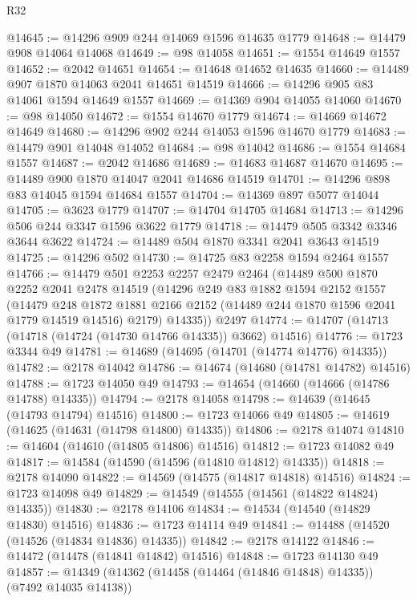 \begin{lexlean}{R32}
\begin{coremodule}
@14645 := @14296 @909 @244 @14069 @1596 @14635 @1779
@14648 := @14479 @908 @14064 @14068
@14649 := @98 @14058
@14651 := @1554 @14649 @1557
@14652 := @2042 @14651
@14654 := @14648 @14652 @14635
@14660 := @14489 @907 @1870 @14063 @2041 @14651 @14519
@14666 := @14296 @905 @83 @14061 @1594 @14649 @1557
@14669 := @14369 @904 @14055 @14060
@14670 := @98 @14050
@14672 := @1554 @14670 @1779
@14674 := @14669 @14672 @14649
@14680 := @14296 @902 @244 @14053 @1596 @14670 @1779
@14683 := @14479 @901 @14048 @14052
@14684 := @98 @14042
@14686 := @1554 @14684 @1557
@14687 := @2042 @14686
@14689 := @14683 @14687 @14670
@14695 := @14489 @900 @1870 @14047 @2041 @14686 @14519
@14701 := @14296 @898 @83 @14045 @1594 @14684 @1557
@14704 := @14369 @897 @5077 @14044
@14705 := @3623 @1779
@14707 := @14704 @14705 @14684
@14713 := @14296 @506 @244 @3347 @1596 @3622 @1779
@14718 := @14479 @505 @3342 @3346 @3644 @3622
@14724 := @14489 @504 @1870 @3341 @2041 @3643 @14519
@14725 := @14296 @502
@14730 := @14725 @83 @2258 @1594 @2464 @1557
@14766 := @14479
    @501
    @2253
    @2257
    @2479
    @2464
    (@14489
      @500
      @1870
      @2252
      @2041
      @2478
      @14519
      (@14296
        @249
        @83
        @1882
        @1594
        @2152
        @1557
        (@14479
          @248
          @1872
          @1881
          @2166
          @2152
          (@14489 @244 @1870 @1596 @2041 @1779 @14519 @14516)
          @2179)
        @14335))
    @2497
@14774 := @14707 (@14713 (@14718 (@14724 (@14730 @14766 @14335)) @3662) @14516)
@14776 := @1723 @3344 @49
@14781 := @14689 (@14695 (@14701 (@14774 @14776) @14335))
@14782 := @2178 @14042
@14786 := @14674 (@14680 (@14781 @14782) @14516)
@14788 := @1723 @14050 @49
@14793 := @14654 (@14660 (@14666 (@14786 @14788) @14335))
@14794 := @2178 @14058
@14798 := @14639 (@14645 (@14793 @14794) @14516)
@14800 := @1723 @14066 @49
@14805 := @14619 (@14625 (@14631 (@14798 @14800) @14335))
@14806 := @2178 @14074
@14810 := @14604 (@14610 (@14805 @14806) @14516)
@14812 := @1723 @14082 @49
@14817 := @14584 (@14590 (@14596 (@14810 @14812) @14335))
@14818 := @2178 @14090
@14822 := @14569 (@14575 (@14817 @14818) @14516)
@14824 := @1723 @14098 @49
@14829 := @14549 (@14555 (@14561 (@14822 @14824) @14335))
@14830 := @2178 @14106
@14834 := @14534 (@14540 (@14829 @14830) @14516)
@14836 := @1723 @14114 @49
@14841 := @14488 (@14520 (@14526 (@14834 @14836) @14335))
@14842 := @2178 @14122
@14846 := @14472 (@14478 (@14841 @14842) @14516)
@14848 := @1723 @14130 @49
@14857 := @14349 (@14362 (@14458 (@14464 (@14846 @14848) @14335)) (@7492 @14035 @14138))

\end{coremodule}
\end{lexlean}
